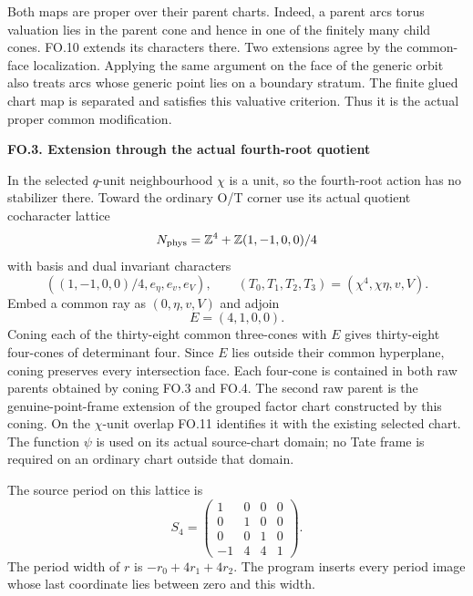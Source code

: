 Both maps are proper over their parent charts. Indeed,
a parent arc\textquotesingle s torus valuation lies in the parent cone
and hence in one of the finitely many child cones.
FO.10 extends its characters there. Two extensions
agree by the common-face localization. Applying the
same argument on the face of the generic orbit also
treats arcs whose generic point lies on a boundary
stratum. The finite glued chart map is separated and
satisfies this valuative criterion. Thus it is the
actual proper common modification.

\par

\medskip\noindent\textbf{FO.3. Extension through the actual fourth-root quotient}

\par\nobreak

In the selected \(q\)-unit neighbourhood \(\chi\) is a
unit, so the fourth-root action has no stabilizer
there. Toward the ordinary O/T corner use its actual
quotient cocharacter lattice
\[
 N_{\rm phys}=\mathbb Z^4+\mathbb Z(1,-1,0,0)/4
\]
with basis and dual invariant characters
\[
 ((1,-1,0,0)/4,e_\eta,e_v,e_V),\qquad
 (T_0,T_1,T_2,T_3)=(\chi^4,\chi\eta,v,V).                  \tag{FO.12}
\]
Embed a common ray as \((0,\eta,v,V)\) and adjoin
\[
 E=(4,1,0,0).                                              \tag{FO.13}
\]
Coning each of the thirty-eight common three-cones
with \(E\) gives thirty-eight four-cones of
determinant four. Since \(E\) lies outside their
common hyperplane, coning preserves every intersection
face. Each four-cone is contained in both raw parents
obtained by coning FO.3 and FO.4.
The second raw parent is the genuine-point-frame
extension of the grouped factor chart constructed
by this coning. On the \(\chi\)-unit overlap
FO.11 identifies it with the existing selected
chart. The function \(\psi\) is used on its
actual source-chart domain; no Tate frame is
required on an ordinary chart outside that domain.

The source period on this lattice is
\[
 S_4=
 \begin{pmatrix}
 1&0&0&0\\0&1&0&0\\0&0&1&0\\-1&4&4&1
 \end{pmatrix}.                                           \tag{FO.14}
\]
The period width of \(r\) is
\(-r_0+4r_1+4r_2\). The program inserts every period
image whose last coordinate lies between zero and
this width.

